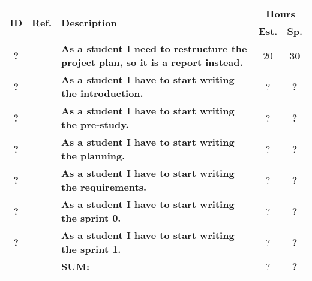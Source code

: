 \label{tab:sprint1Documentationstories}
\def\arraystretch{1.25}
 
\begin{longtable}{ccXcc}

\toprule[0.5mm]
\multirow{2}{*}{\textbf{ID}} &
\multirow{2}{*}{\textbf{Ref.}} & \multirow{2}{*}{\textbf{Description}} & \multicolumn{2}{c}{\textbf{Hours}} \\
 					& & & \textbf{Est.} & \textbf{Sp.} \\
\midrule
\textbf{?} 	&& {\bf As a student I need to restructure the project plan, so it is a report instead.}	& 	 	20	& \textbf{ 30} \\

\textbf{?} 	&& {\bf As a student I have to start writing the introduction.} 					& 		?	& \textbf{?} \\

\textbf{?} 	&& {\bf As a student I have to start writing the pre-study.} 						& 		?	& \textbf{?} \\

\textbf{?} 	&& {\bf As a student I have to start writing the planning.} 						& 		?	& \textbf{?} \\

\textbf{?} 	&& {\bf As a student I have to start writing the requirements.} 					& 		?	& \textbf{?} \\

\textbf{?} 	&& {\bf As a student I have to start writing the sprint 0.} 						& 		?	& \textbf{?} \\

\textbf{?} 	&& {\bf As a student I have to start writing the sprint 1.} 						& 		?	& \textbf{?} \\							
				
\hline
				&& \textbf{SUM:}		&		?	& \textbf{?}
 \\																			
\bottomrule[0.5mm]
\end{longtable}
